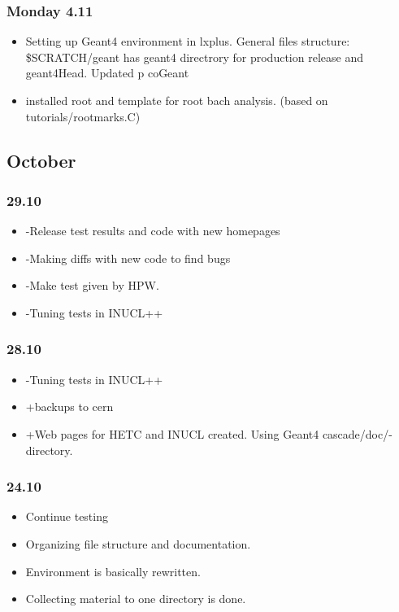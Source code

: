\subsubsection{Monday 4.11}
\begin{itemize}
\item Setting up Geant4 environment in lxplus. General files
  structure: \$SCRATCH/geant has geant4 directrory for production
  release and geant4Head. Updated p coGeant
\item installed root and template for root bach analysis. (based on
  tutorials/rootmarks.C)
\end{itemize}


\subsection{October}

\subsubsection{29.10}
\begin{itemize}
\item -Release test results and code with new homepages
\item -Making diffs with new code to find bugs
\item -Make test given by HPW.
\item -Tuning tests in INUCL++
\end{itemize}

\subsubsection{28.10}
\begin{itemize}
\item -Tuning tests in INUCL++
\item +backups to cern
\item +Web pages for HETC and INUCL created. Using Geant4
  cascade/doc/-directory.
\end{itemize}


\subsubsection{24.10}

\begin{itemize}
\item Continue testing
\item Organizing file structure and documentation.
\item Environment is basically rewritten.
\item Collecting material to one directory is done.
\end{itemize}

